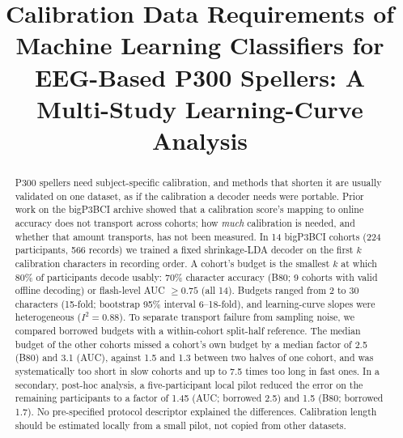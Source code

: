 \documentclass[conference]{IEEEtran}
\begin{document}
\title{Calibration Data Requirements of Machine Learning Classifiers for EEG-Based P300 Spellers: A Multi-Study Learning-Curve Analysis}

\author{
\and
{}
}

\maketitle

\begin{abstract}
P300 spellers need subject-specific calibration, and methods that shorten it are usually validated on one dataset, as if the calibration a decoder needs were portable. Prior work on the bigP3BCI archive showed that a calibration score's mapping to online accuracy does not transport across cohorts; how \emph{much} calibration is needed, and whether that amount transports, has not been measured. In 14 bigP3BCI cohorts (224 participants, 566 records) we trained a fixed shrinkage-LDA decoder on the first $k$ calibration characters in recording order. A cohort's budget is the smallest $k$ at which 80\% of participants decode usably: 70\% character accuracy (B80; 9 cohorts with valid offline decoding) or flash-level AUC $\geq 0.75$ (all 14). Budgets ranged from 2 to 30 characters (15-fold; bootstrap 95\% interval 6--18-fold), and learning-curve slopes were heterogeneous ($I^2=0.88$). To separate transport failure from sampling noise, we compared borrowed budgets with a within-cohort split-half reference. The median budget of the other cohorts missed a cohort's own budget by a median factor of 2.5 (B80) and 3.1 (AUC), against 1.5 and 1.3 between two halves of one cohort, and was systematically too short in slow cohorts and up to 7.5 times too long in fast ones. In a secondary, post-hoc analysis, a five-participant local pilot reduced the error on the remaining participants to a factor of 1.45 (AUC; borrowed 2.5) and 1.5 (B80; borrowed 1.7). No pre-specified protocol descriptor explained the differences. Calibration length should be estimated locally from a small pilot, not copied from other datasets.
\end{abstract}
\end{document}
